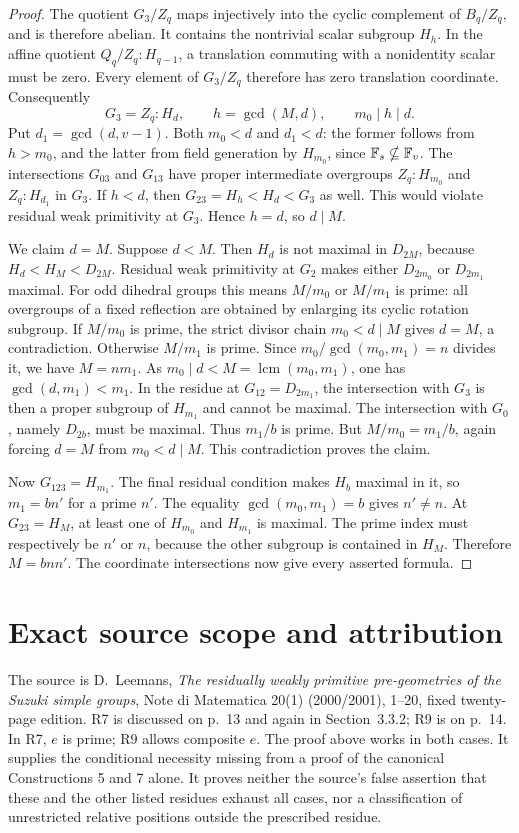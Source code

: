 \documentclass[11pt,a4paper]{article}
\begin{document}
\begin{proof}
The quotient $G_3/Z_q$ maps injectively into the cyclic complement
of $B_q/Z_q$, and is therefore abelian. It contains the nontrivial
scalar subgroup $H_h$. In the affine quotient $Q_q/Z_q:H_{q-1}$,
a translation commuting with a nonidentity scalar must be zero.
Every element of $G_3/Z_q$ therefore has zero translation coordinate.
Consequently
\[
 G_3=Z_q:H_d,\qquad h=\gcd(M,d),\qquad m_0\mid h\mid d.
\]
Put $d_1=\gcd(d,v-1)$. Both $m_0<d$ and $d_1<d$:
the former follows from $h>m_0$, and the latter from field generation
by $H_{m_0}$, since $\mathbb F_s\nsubseteq\mathbb F_v$.
The intersections $G_{03}$ and $G_{13}$ have proper intermediate
overgroups $Z_q:H_{m_0}$ and $Z_q:H_{d_1}$ in $G_3$.
If $h<d$, then $G_{23}=H_h<H_d<G_3$ as well. This would violate
residual weak primitivity at $G_3$. Hence $h=d$, so $d\mid M$.

We claim $d=M$. Suppose $d<M$. Then $H_d$ is not maximal in
$D_{2M}$, because $H_d<H_M<D_{2M}$. Residual weak primitivity
at $G_2$ makes either $D_{2m_0}$ or $D_{2m_1}$ maximal.
For odd dihedral groups this means $M/m_0$ or $M/m_1$ is prime:
all overgroups of a fixed reflection are obtained by enlarging its
cyclic rotation subgroup.
If $M/m_0$ is prime, the strict divisor chain $m_0<d\mid M$ gives
$d=M$, a contradiction. Otherwise $M/m_1$ is prime. Since
$m_0/\gcd(m_0,m_1)=n$ divides it, we have $M=nm_1$.
As $m_0\mid d<M=\operatorname{lcm}(m_0,m_1)$, one has
$\gcd(d,m_1)<m_1$. In the residue at $G_{12}=D_{2m_1}$, the
intersection with $G_3$ is then a proper subgroup of $H_{m_1}$
and cannot be maximal. The intersection with $G_0$, namely $D_{2b}$,
must be maximal. Thus $m_1/b$ is prime. But
$M/m_0=m_1/b$, again forcing $d=M$ from $m_0<d\mid M$.
This contradiction proves the claim.

Now $G_{123}=H_{m_1}$. The final residual condition makes
$H_b$ maximal in it, so $m_1=bn'$ for a prime $n'$.
The equality $\gcd(m_0,m_1)=b$ gives $n'\ne n$.
At $G_{23}=H_M$, at least one of $H_{m_0}$ and $H_{m_1}$ is
maximal. The prime index must respectively be $n'$ or $n$, because
the other subgroup is contained in $H_M$. Therefore $M=bnn'$.
The coordinate intersections now give every asserted formula.
\end{proof}

\section{Exact source scope and attribution}
The source is D.~Leemans, \emph{The residually weakly primitive
pre-geometries of the Suzuki simple groups}, Note di Matematica
20(1) (2000/2001), 1--20, fixed twenty-page edition.
R7 is discussed on p.~13 and again in Section~3.3.2; R9 is on p.~14.
In R7, $e$ is prime; R9 allows composite $e$. The proof above works
in both cases. It supplies the conditional necessity missing from a
proof of the canonical Constructions 5 and 7 alone. It proves neither
the source's false assertion that these and the other listed residues
exhaust all cases, nor a classification of unrestricted relative
positions outside the prescribed residue.
\end{document}
